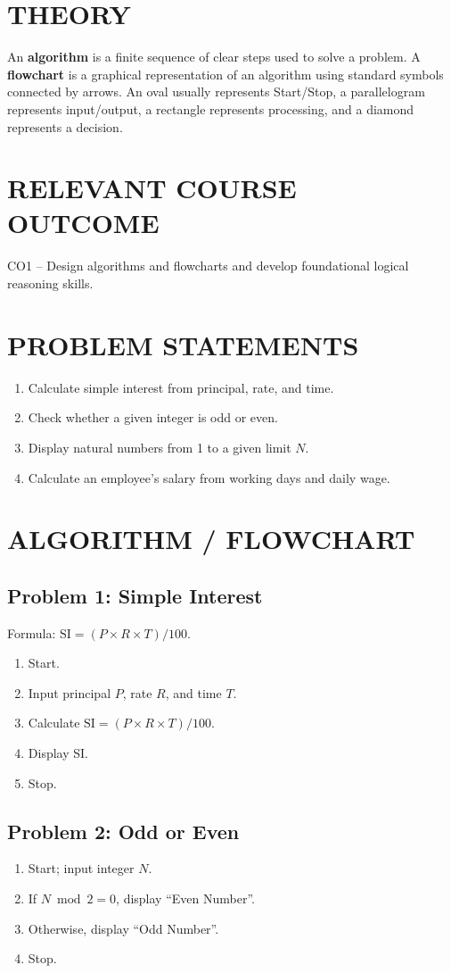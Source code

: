 \documentclass[12pt,a4paper]{report}
\newcommand{\courseoutcome}[1]{\section*{RELEVANT COURSE OUTCOME}#1}
\begin{document}
\section*{THEORY}
An \textbf{algorithm} is a finite sequence of clear steps used to solve a problem.
A \textbf{flowchart} is a graphical representation of an algorithm using standard
symbols connected by arrows. An oval usually represents Start/Stop, a parallelogram
represents input/output, a rectangle represents processing, and a diamond represents
a decision.

\courseoutcome{CO1 -- Design algorithms and flowcharts and develop foundational logical reasoning skills.}

\section*{PROBLEM STATEMENTS}
\begin{enumerate}
\item Calculate simple interest from principal, rate, and time.
\item Check whether a given integer is odd or even.
\item Display natural numbers from 1 to a given limit \(N\).
\item Calculate an employee's salary from working days and daily wage.
\end{enumerate}

\section*{ALGORITHM / FLOWCHART}
\subsection*{Problem 1: Simple Interest}
Formula: \(\mathrm{SI}=(P\times R\times T)/100\).
\begin{enumerate}
\item Start.
\item Input principal \(P\), rate \(R\), and time \(T\).
\item Calculate \(\mathrm{SI}=(P\times R\times T)/100\).
\item Display SI.
\item Stop.
\end{enumerate}
\subsection*{Problem 2: Odd or Even}
\begin{enumerate}
\item Start; input integer \(N\).
\item If \(N \bmod 2=0\), display ``Even Number''.
\item Otherwise, display ``Odd Number''.
\item Stop.
\end{enumerate}
\end{document}
